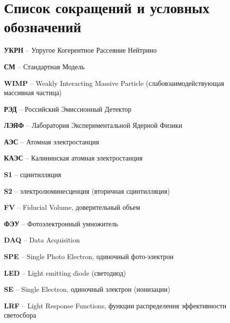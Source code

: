 \chapter*{Список сокращений и условных обозначений}             %
\textbf{УКРН} -- Упругое Когерентное Рассеяние Нейтрино

\textbf{СМ} -- Стандартная Модель

\textbf{WIMP} -- Weakly Interacting Massive Particle (слабовзаимодействующая массивная частица)

\textbf{РЭД} -- Российский Эмиссионный Детектор

\textbf{ЛЭЯФ} -- Лаборатория Экспериментальной Ядерной Физики

\textbf{АЭС} -- Атомная электростанция

\textbf{КАЭС} -- Калининская атомная электростанция

\textbf{S1} -- сцинтилляция

\textbf{S2} -- электролюминесценция (вторичная сцинтилляция)

\textbf{FV} -- Fiducial Volume, доверительный объем

\textbf{ФЭУ} -- Фотоэлектронный умножитель

\textbf{DAQ} -- Data Acquisition

\textbf{SPE} -- Single Photo Electron, одиночный фото-электрон

\textbf{LED} -- Light emitting diode (светодиод)
 
\textbf{SE} -- Single Electron, одиночный электрон (ионизации)

\textbf{LRF} -- Light Response Functions, функции распределения эффективности светосбора


